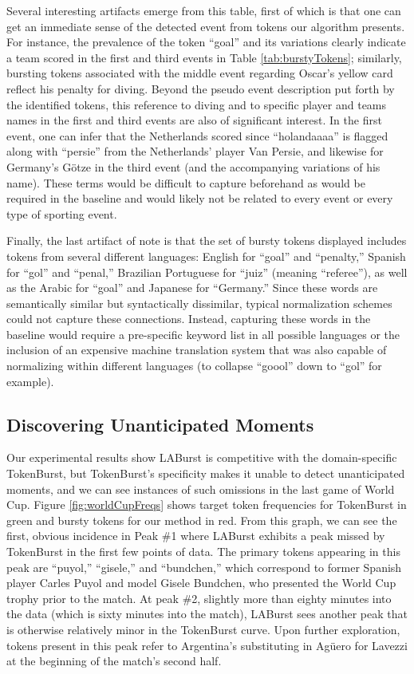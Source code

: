 \documentclass[letterpaper]{article}
\begin{document}
Several interesting artifacts emerge from this table, first of which is that one can get an immediate sense of the detected event from tokens our algorithm presents. 
For instance, the prevalence of the token ``goal'' and its variations clearly indicate a team scored in the first and third events in Table \ref{tab:burstyTokens}; similarly, bursting tokens associated with the middle event regarding Oscar's yellow card reflect his penalty for diving.
Beyond the pseudo event description put forth by the identified tokens, this reference to diving and to specific player and teams names in the first and third events are also of significant interest.
In the first event, one can infer that the Netherlands scored since ``holandaaaa'' is flagged along with ``persie'' from the Netherlands' player Van Persie, and likewise for Germany's G\"{o}tze in the third event (and the accompanying variations of his name).
These terms would be difficult to capture beforehand as would be required in the baseline and would likely not be related to every event or every type of sporting event.

Finally, the last artifact of note is that the set of bursty tokens displayed includes tokens from several different languages: English for ``goal'' and ``penalty,'' Spanish for ``gol'' and ``penal,'' Brazilian Portuguese for ``juiz'' (meaning ``referee''), as well as the Arabic for ``goal'' and Japanese for ``Germany.''
Since these words are semantically similar but syntactically dissimilar, typical normalization schemes could not capture these connections.
Instead, capturing these words in the baseline would require a pre-specific keyword list in all possible languages or the inclusion of an expensive machine translation system that was also capable of normalizing within different languages (to collapse ``goool'' down to ``gol'' for example).

\subsection{Discovering Unanticipated Moments}
\label{sect:eventDiscovery}

Our experimental results show LABurst is competitive with the domain-specific TokenBurst, but TokenBurst's specificity makes it unable to detect unanticipated moments, and we can see instances of such omissions in the last game of World Cup.
Figure \ref{fig:worldCupFreqs} shows target token frequencies for TokenBurst in green and bursty tokens for our method in red.
From this graph, we can see the first, obvious incidence in Peak \#1 where LABurst exhibits a peak  missed by TokenBurst in the first few points of data.
The primary tokens appearing in this peak are ``puyol,'' ``gisele,'' and ``bundchen,'' which correspond to former Spanish player Carles Puyol and model Gisele Bundchen, who presented the World Cup trophy prior to the match.
At peak \#2, slightly more than eighty minutes into the data (which is sixty minutes into the match), LABurst sees another peak that is otherwise relatively minor in the TokenBurst curve.
Upon further exploration, tokens present in this peak refer to Argentina's substituting in Ag\"{u}ero for Lavezzi at the beginning of the match's second half.
\end{document}
